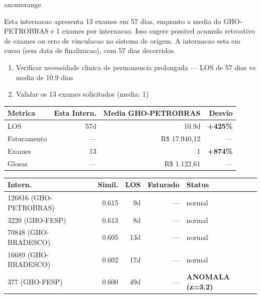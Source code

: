 \documentclass[a4paper,10pt]{article}
\begin{document}
\begin{anomalycard}[Internacao 163212 | GHO-PETROBRAS | ALTO (z=3.75)]{anomorange}
\vspace{2pt}\begin{tcolorbox}[colback=severityred!20,colframe=anomorange,title={\textbf{Interpretacao de Negocio}},fonttitle=\bfseries\small,left=4pt,right=4pt,top=3pt,bottom=3pt]
{\small Esta internacao apresenta 13 exames em 57 dias, enquanto a media do GHO-PETROBRAS e 1 exames por internacao. Isso sugere possivel acumulo retroativo de exames ou erro de vinculacao no sistema de origem. A internacao esta em curso (sem data de finalizacao), com 57 dias decorridos.}
\end{tcolorbox}
\begin{tcolorbox}[colback=severityyellow!30,colframe=anomorange,title={\textbf{Recomendacoes Especificas}},fonttitle=\bfseries\small,left=4pt,right=4pt,top=3pt,bottom=3pt]
\begin{enumerate}[nosep,leftmargin=16pt]
\item {\small Verificar necessidade clinica de permanencia prolongada --- LOS de 57 dias vs media de 10.9 dias}
\item {\small Validar os 13 exames solicitados (media: 1)}
\end{enumerate}
\end{tcolorbox}
\begin{center}\begin{tabular}{l r r r}\toprule\textbf{Metrica} & \textbf{Esta Intern.} & \textbf{Media GHO-PETROBRAS} & \textbf{Desvio} \\\midrule
LOS & 57d & 10.9d & \textcolor{anomred}{\textbf{+425\%}} \\
Faturamento & --- & R\$ 17.940,12 & --- \\
Exames & 13 & 1 & \textcolor{anomred}{\textbf{+874\%}} \\
Glosas & --- & R\$ 1.122,61 & --- \\
\bottomrule\end{tabular}\end{center}

\begin{tabular}{l r r r l}\toprule\textbf{Intern.} & \textbf{Simil.} & \textbf{LOS} & \textbf{Faturado} & \textbf{Status} \\\midrule
126816 (GHO-PETROBRAS) & 0.615 & 9d & --- & \textcolor{jcubeblue}{normal} \\
3220 (GHO-FESP) & 0.613 & 8d & --- & \textcolor{jcubeblue}{normal} \\
70848 (GHO-BRADESCO) & 0.605 & 13d & --- & \textcolor{jcubeblue}{normal} \\
16689 (GHO-BRADESCO) & 0.602 & 17d & --- & \textcolor{jcubeblue}{normal} \\
377 (GHO-FESP) & 0.600 & 49d & --- & \textcolor{anomred}{\textbf{ANOMALA (z=3.2)}} \\
\bottomrule\end{tabular}


\end{anomalycard}
\end{document}
